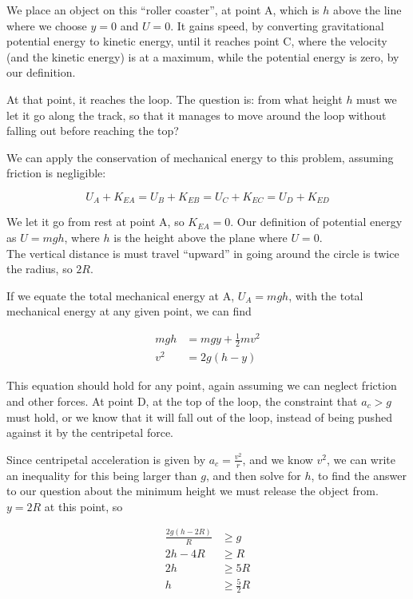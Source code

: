 \documentclass[12pt,a4paper]{report}
\begin{document}
We place an object on this ``roller coaster'', at point A, which is $h$ above the line where we choose $y = 0$ and $U = 0$. It gains speed, by converting gravitational potential energy to kinetic energy, until it reaches point C, where the velocity (and the kinetic energy) is at a maximum, while the potential energy is zero, by our definition.

At that point, it reaches the loop. The question is: from what height $h$ must we let it go along the track, so that it manages to move around the loop without falling out before reaching the top?

We can apply the conservation of mechanical energy to this problem, assuming friction is negligible:

\begin{equation}
U_A + K_{EA} = U_B + K_{EB} = U_C + K_{EC} = U_D + K_{ED}
\end{equation}

We let it go from rest at point A, so $K_{EA} = 0$. Our definition of potential energy as $U = m g h$, where $h$ is the height above the plane where $U = 0$.\\
The vertical distance is must travel ``upward'' in going around the circle is twice the radius, so $2R$.

If we equate the total mechanical energy at A, $U_A = m g h$, with the total mechanical energy at any given point, we can find

\begin{align}
m g h &= m g y + \frac{1}{2} m v^2\\
v^2   &= 2g (h - y)
\end{align}

This equation should hold for any point, again assuming we can neglect friction and other forces. At point D, at the top of the loop, the constraint that $a_c > g$ must hold, or we know that it will fall out of the loop, instead of being pushed against it by the centripetal force.

Since centripetal acceleration is given by $\displaystyle a_c = \frac{v^2}{r}$, and we know $v^2$, we can write an inequality for this being larger than $g$, and then solve for $h$, to find the answer to our question about the minimum height we must release the object from.\\
$y = 2 R$ at this point, so

\begin{align}
\frac{2g (h - 2R)}{R} &\ge g\\
2 h - 4R &\ge R\\
2 h &\ge 5R\\
h &\ge \frac{5}{2} R
\end{align}
\end{document}
